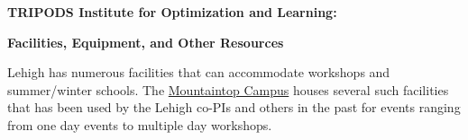

\hypersetup{colorlinks,urlcolor=blue}

\let\oldFootnote\footnote
\newcommand\nextToken\relax

\renewcommand\footnote[1]{%
    \oldFootnote{#1}\futurelet\nextToken\isFootnote}

\newcommand\isFootnote{%
    \ifx\footnote\nextToken\textsuperscript{,}\fi}


  
\begin{center}
  {\bf \large TRIPODS Institute for Optimization and Learning:}
  \smallskip
  
  {\bf \large Facilities, Equipment, and Other Resources}
\end{center} 
 

Lehigh has numerous facilities that can accommodate workshops and summer/winter schools.  The \href{https://lehighmountaintop.wordpress.com/learn-more/}{Mountaintop Campus} houses several such facilities
 that has been used by the Lehigh co-PIs and others in the past for 
events ranging from one day events to multiple day workshops. 

